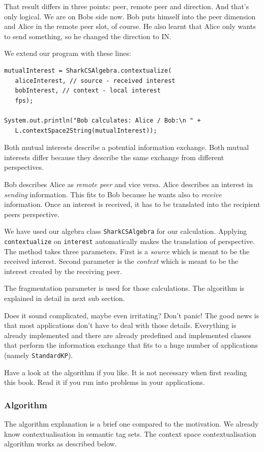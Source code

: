 That result differs in three points: peer, remote peer and direction. And that's only logical. We are on Bobs side now. Bob puts himself into the peer dimension and Alice in the remote peer slot, of course. He also learnt that Alice only wants to send something, so he changed the direction to IN.

We extend our program with these lines:
\begin{verbatim}
mutualInterest = SharkCSAlgebra.contextualize(
   aliceInterest, // source - received interest
   bobInterest, // context - local interest
   fps);

System.out.println("Bob calculates: Alice / Bob:\n " + 
   L.contextSpace2String(mutualInterest));
\end{verbatim}

Both mutual interests describe a potential information exchange. Both mutual interests differ because they describe the same exchange from different perspectives. 

Bob describes Alice as {\it remote peer} and vice versa. Alice describes an interest in {\it sending} information. This fits to Bob because he wants also to {\it receive} information. Once an interest is received, it has to be translated into the recipient peers perspective.

We have used our algebra class {\tt SharkCSAlgebra} for our calculation. Applying {\tt contextualize} on {\tt interest} automatically makes the translation of perspective. The method takes three parameters. First is a {\it source} which is meant to be the received interest. Second parameter is the {\it context} which is meant to be the interest created by the receiving peer.

The fragmentation parameter is used for those calculations. The algorithm is explained in detail in next sub section.

Does it sound complicated, maybe even irritating? Don't panic! The good news is that most applications don't have to deal with those details. Everything is already implemented and there are already predefined and implemented classes that perform the information exchange that fits to a huge number of applications (namely {\tt StandardKP}). 

Have a look at the algorithm if you like. It is not necessary when first reading this book. Read it if you run into problems in your applications.

\subsubsection{Algorithm}
The algorithm explanation is a brief one compared to the motivation. We already know contextualisation in semantic tag sets. The context space contextualisation algorithm works as described below.

